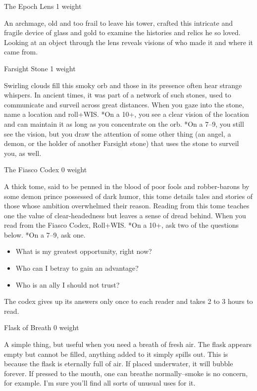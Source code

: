  The Epoch Lens 1 weight


 An archmage, old and too frail to leave his tower, crafted this intricate and fragile device of glass and gold to examine the histories and relics he so loved. Looking at an object through the lens reveals visions of who made it and where it came from.


 Farsight Stone 1 weight


 Swirling clouds fill this smoky orb and those in its presence often hear strange whispers. In ancient times, it was part of a network of such stones, used to communicate and surveil across great distances. When you gaze into the stone, name a location and roll+WIS. *On a 10+, you see a clear vision of the location and can maintain it as long as you concentrate on the orb. *On a 7--9, you still see the vision, but you draw the attention of some other thing (an angel, a demon, or the holder of another Farsight stone) that uses the stone to surveil you, as well.


 The Fiasco Codex 0 weight


 A thick tome, said to be penned in the blood of poor fools and robber-barons by some demon prince possessed of dark humor, this tome details tales and stories of those whose ambition overwhelmed their reason. Reading from this tome teaches one the value of clear-headedness but leaves a sense of dread behind. When you read from the Fiasco Codex, Roll+WIS. *On a 10+, ask two of the questions below. *On a 7--9, ask one.
\begin{itemize}
\item What is my greatest opportunity, right now?
\item Who can I betray to gain an advantage?
\item Who is an ally I should not trust?

\end{itemize}


 The codex gives up its answers only once to each reader and takes 2 to 3 hours to read.


 Flask of Breath 0 weight


 A simple thing, but useful when you need a breath of fresh air. The flask appears empty but cannot be filled, anything added to it simply spills out. This is because the flask is eternally full of air. If placed underwater, it will bubble forever. If pressed to the mouth, one can breathe normally--smoke is no concern, for example. I'm sure you'll find all sorts of unusual uses for it.


